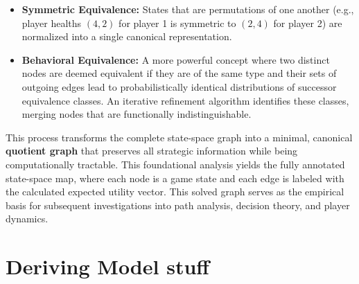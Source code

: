 \documentclass{article}
\begin{document}
\begin{itemize}
    \item \textbf{Symmetric Equivalence:} States that are permutations of one another (e.g., player healths $(4, 2)$ for player 1 is symmetric to $(2, 4)$ for player 2) are normalized into a single canonical representation.

    \item \textbf{Behavioral Equivalence:} A more powerful concept where two distinct nodes are deemed equivalent if they are of the same type and their sets of outgoing edges lead to probabilistically identical distributions of successor equivalence classes. An iterative refinement algorithm identifies these classes, merging nodes that are functionally indistinguishable.
\end{itemize}

This process transforms the complete state-space graph into a minimal, canonical \textbf{quotient graph} that preserves all strategic information while being computationally tractable. This foundational analysis yields the fully annotated state-space map, where each node is a game state and each edge is labeled with the calculated expected utility vector. This solved graph serves as the empirical basis for subsequent investigations into path analysis, decision theory, and player dynamics.

\section{Deriving Model stuff}
\end{document}
